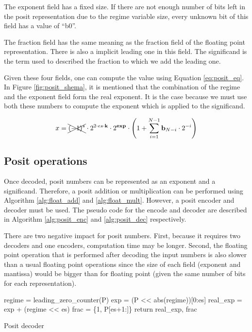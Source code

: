 The exponent field has a fixed size. If there are not enough number of bits left in the posit representation due to the regime variable size, every unknown bit of this field has a value of ``b0''.

The fraction field has the same meaning as the fraction field of the floating point representation. There is also a implicit leading one in this field. The significand is the term used to described the fraction to which we add the leading one.

Given these four fields, one can compute the value using Equation \ref{eq:posit_eq}. In Figure \ref{fig:posit_shema}, it is mentioned that the combination of the regime and the exponent field form the real exponent. It is the case because we must use both these numbers to compute the exponent which is applied to the significand.


\begin{equation}
x = \xcancel{(-1)^s} \cdot 2^{2\cdot es \cdot \text{\textbf{k}}} \cdot 2^\text{\textbf{exp}} \cdot \left( 1 + \sum_{i=1}^{N-1}  \text{\textbf{b}}_{N-i} \cdot 2^{-i} \right)
\label{eq:posit_eq}
\end{equation}

\subsection{Posit operations}
Once decoded, posit numbers can be represented as an exponent and a significand. Therefore, a posit addition or multiplication can be performed using Algorithm \ref{alg:float_add} and \ref{alg:float_mult}. However, a posit encoder and decoder must be used. The pseudo code for the encode and decoder are described in Algorithm \ref{alg:posit_enc} and \ref{alg:posit_dec} respectively.

There are two negative impact for posit numbers. First, because it requires two decoders and one encoders, computation time may be longer. Second, the floating point operation that is performed after decoding the input numbers is also slower than a usual floating point operations since the size of each field (exponent and mantissa) would be bigger than for floating point (given the same number of bits for each representation).

\begin{algorithm}[H]
\SetAlgoLined
{}
regime = leading\_zero\_counter(P)\;
exp = (P << abs(regime))[0:es]\;
real\_exp = exp + (regime << es)\;
frac = \{1, P[es+1:]\}\;
return real\_exp, frac\;
\caption{Posit decoder}
\label{alg:posit_dec}
\end{algorithm}

